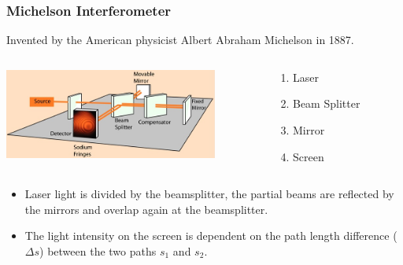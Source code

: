 \documentclass{beamer}
\begin{document}
\begin{frame}\frametitle{Michelson Interferometer}

Invented by the American physicist Albert Abraham Michelson in 1887.

\begin{columns}
\begin{column}{7cm}
\begin{center}
\includegraphics[width=7cm]{fig/michelson2.jpg}
\end{center}
\end{column}
\begin{column}{3cm}
\begin{enumerate}
\item Laser
\item Beam Splitter
\item Mirror
\item Screen
\end{enumerate}
\end{column}
\end{columns}

\vspace{0.25cm}

\begin{itemize}
\item Laser light is divided by the beamsplitter, the partial beams are reflected by the mirrors and overlap again at the beamsplitter.
\item The light intensity on the screen is dependent on the path length difference ($\Delta s$) between the two paths $s_1$ and $s_2$. 
\end{itemize}
\end{frame}
\end{document}
